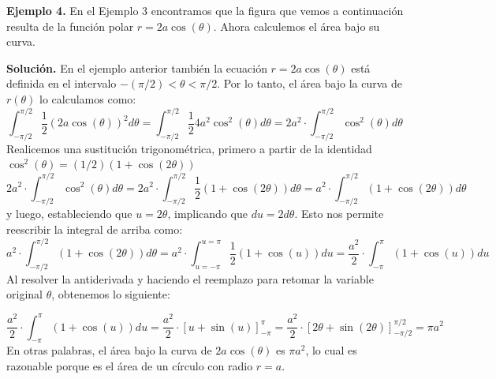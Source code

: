 \documentclass[12pt]{article}
\begin{document}
\textbf{Ejemplo 4.} En el Ejemplo 3 encontramos que la figura que vemos a continuación resulta de la función polar $r = 2a \cos(\theta)$. Ahora calculemos el área bajo su curva.

\begin{figure}[hbt!]
\centering


\end{figure}

\textbf{Solución.} En el ejemplo anterior también la ecuación $r = 2a \cos(\theta)$ está definida en el intervalo $-(\pi/2) < \theta < \pi/2$. Por lo tanto, el área bajo la curva de $r(\theta)$ lo calculamos como:
\[
  \int_{-\pi/2}^{\pi/2} \frac{1}{2} \left(2a \cos(\theta)\right)^{2} d\theta = \int_{-\pi/2}^{\pi/2} \frac{1}{2} 4a^{2} \cos^{2}(\theta) d\theta
                                                                             = 2a^{2} \cdot \int_{-\pi/2}^{\pi/2} \cos^{2}(\theta) d\theta
\]
Realicemos una sustitución trigonométrica, primero a partir de la identidad $\cos^{2}(\theta) = (1/2) (1 + \cos(2\theta))$
\[
  2a^{2} \cdot \int_{-\pi/2}^{\pi/2} \cos^{2}(\theta) d\theta = 2a^{2} \cdot \int_{-\pi/2}^{\pi/2} \frac{1}{2} (1 + \cos(2\theta)) d\theta
                                                              = a^{2} \cdot \int_{-\pi/2}^{\pi/2} (1 + \cos(2\theta)) d\theta
\]
y luego, estableciendo que $u = 2\theta$, implicando que $du = 2 d\theta$. Esto nos permite reescribir la integral de arriba como:
\[
  a^{2} \cdot \int_{-\pi/2}^{\pi/2} (1 + \cos(2\theta)) d\theta = a^{2} \cdot \int_{u = -\pi}^{u = \pi} \frac{1}{2} (1 + \cos(u)) du
                                                                = \frac{a^{2}}{2} \cdot \int_{-\pi}^{\pi} (1 + \cos(u)) du
\]
Al resolver la antiderivada y haciendo el reemplazo para retomar la variable original $\theta$, obtenemos lo siguiente:

\[
  \frac{a^{2}}{2} \cdot \int_{-\pi}^{\pi} (1 + \cos(u)) du = \frac{a^{2}}{2} \cdot \left[u + \sin(u)\right]_{-\pi}^{\pi}
                                                           = \frac{a^{2}}{2} \cdot \left[2\theta + \sin(2\theta)\right]_{-\pi/2}^{\pi/2}
                                                           = \pi a^{2}
\]
En otras palabras, el área bajo la curva de $2a \cos(\theta)$ es $\pi a^{2}$, lo cual es razonable porque es el área de un círculo con radio $r = a$.
\end{document}
